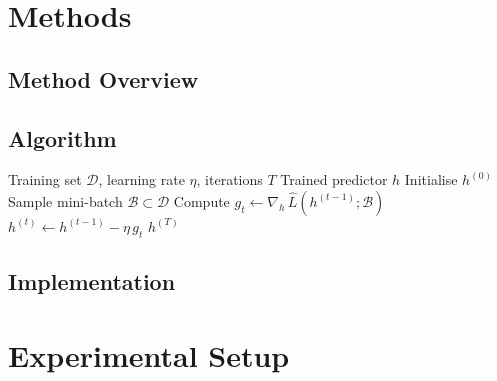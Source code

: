 \documentclass[11pt,a4paper,oneside]{report}
\newcommand{\dataset}{\mathcal{D}}        %
\newcommand{\hypothesis}{h}               %
\begin{document}
\chapter{Methods}
\label{ch:methods}


\section{Method Overview}

\section{Algorithm}
\label{sec:algo}

\begin{algorithm}[h]
\caption{TODO: Name of your algorithm}
\label{alg:main}
\begin{algorithmic}[1]
\Require Training set $\dataset$, learning rate $\eta$, iterations $T$
\Ensure  Trained predictor $\hypothesis$
\State Initialise $\hypothesis^{(0)}$
    \State Sample mini-batch $\mathcal{B} \subset \dataset$
    \State Compute $g_t \gets \nabla_{\hypothesis}\, \widehat{L}(\hypothesis^{(t-1)}; \mathcal{B})$
    \State $\hypothesis^{(t)} \gets \hypothesis^{(t-1)} - \eta\, g_t$
\EndFor
\State \Return $\hypothesis^{(T)}$
\end{algorithmic}
\end{algorithm}

\section{Implementation}

\chapter{Experimental Setup}
\label{ch:setup}
\end{document}
